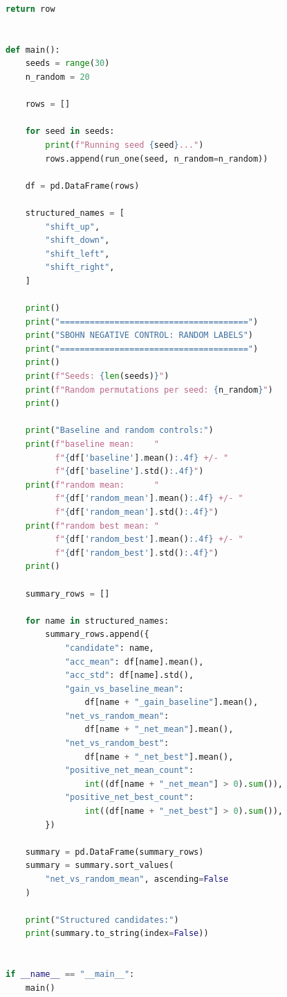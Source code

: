 \documentclass[11pt,a4paper]{report}
\begin{document}
\begin{lstlisting}[language=Python]
    return row


def main():
    seeds = range(30)
    n_random = 20

    rows = []

    for seed in seeds:
        print(f"Running seed {seed}...")
        rows.append(run_one(seed, n_random=n_random))

    df = pd.DataFrame(rows)

    structured_names = [
        "shift_up",
        "shift_down",
        "shift_left",
        "shift_right",
    ]

    print()
    print("======================================")
    print("SBOHN NEGATIVE CONTROL: RANDOM LABELS")
    print("======================================")
    print()
    print(f"Seeds: {len(seeds)}")
    print(f"Random permutations per seed: {n_random}")
    print()

    print("Baseline and random controls:")
    print(f"baseline mean:    "
          f"{df['baseline'].mean():.4f} +/- "
          f"{df['baseline'].std():.4f}")
    print(f"random mean:      "
          f"{df['random_mean'].mean():.4f} +/- "
          f"{df['random_mean'].std():.4f}")
    print(f"random best mean: "
          f"{df['random_best'].mean():.4f} +/- "
          f"{df['random_best'].std():.4f}")
    print()

    summary_rows = []

    for name in structured_names:
        summary_rows.append({
            "candidate": name,
            "acc_mean": df[name].mean(),
            "acc_std": df[name].std(),
            "gain_vs_baseline_mean":
                df[name + "_gain_baseline"].mean(),
            "net_vs_random_mean":
                df[name + "_net_mean"].mean(),
            "net_vs_random_best":
                df[name + "_net_best"].mean(),
            "positive_net_mean_count":
                int((df[name + "_net_mean"] > 0).sum()),
            "positive_net_best_count":
                int((df[name + "_net_best"] > 0).sum()),
        })

    summary = pd.DataFrame(summary_rows)
    summary = summary.sort_values(
        "net_vs_random_mean", ascending=False
    )

    print("Structured candidates:")
    print(summary.to_string(index=False))


if __name__ == "__main__":
    main()
\end{lstlisting}
\end{document}

